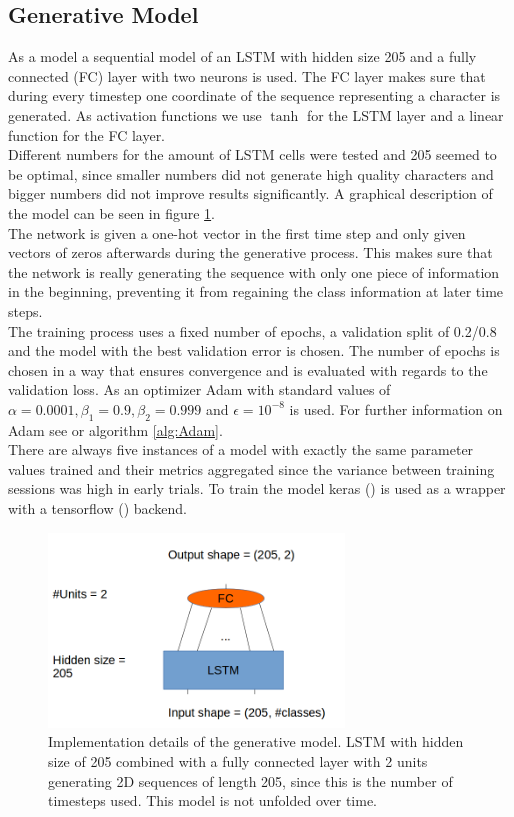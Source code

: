 \subsection{Generative Model}
\label{subsec:generative_model}
	As a model a sequential model of an LSTM with hidden size 205 and a fully connected (FC) layer with two neurons is used. The FC layer makes sure that during every timestep one coordinate of the sequence representing a character is generated. As activation functions we use \textit{$\tanh$} for the LSTM layer and a linear function for the FC layer. \\
	Different numbers for the amount of LSTM cells were tested and 205 seemed to be optimal, since smaller numbers did not generate high quality characters and bigger numbers did not improve results significantly. A graphical description of the model can be seen in figure \ref{fig:generative_model_details}. \\
	The network is given a one-hot vector in the first time step and only given vectors of zeros afterwards during the generative process. This makes sure that the network is really generating the sequence with only one piece of information in the beginning, preventing it from regaining the class information at later time steps.\\
	The training process uses a fixed number of epochs, a validation split of 0.2/0.8 and the model with the best validation error is chosen. The number of epochs is chosen in a way that ensures convergence and is evaluated with regards to the validation loss. As an optimizer Adam with standard values of $\alpha = 0.0001, \beta_1 = 0.9, \beta_2 = 0.999$ and $\epsilon = 10^{-8}$ is used. For further information on Adam see \cite{AdamKingmaB14} or algorithm \ref{alg:Adam}.\\
	There are always five instances of a model with exactly the same parameter values trained and their metrics aggregated since the variance between training sessions was high in early trials. 
	To train the model keras (\cite{chollet2015keras}) is used as a wrapper with a tensorflow (\cite{tensorflow2015-whitepaper}) backend. 
	
\begin{figure}[!htb]
	\centering
	\includegraphics[width=0.7\textwidth]{images/generative_model_details.png}
	\caption{Implementation details of the generative model. LSTM with hidden size of 205 combined with a fully connected layer with 2 units generating 2D sequences of length 205, since this is the number of timesteps used. This model is not unfolded over time.}
	\label{fig:generative_model_details}
\end{figure}
	
